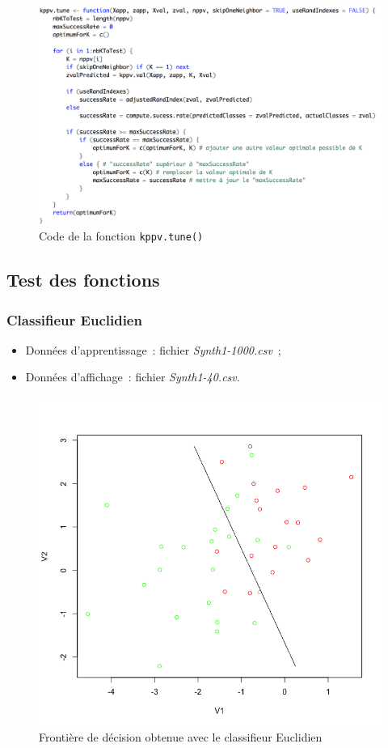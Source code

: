 \documentclass[a4paper,10pt]{report}
\begin{document}
\begin{figure}[H]
	\centering
	\captionsetup{justification=centering, margin=4cm}
	\includegraphics[width=.9\linewidth]{img/1-1-2-kppv-tune-code}
	\caption{\small Code de la fonction \texttt{kppv.tune()}}	
	\label{fig:1-1-2-kppv-tune-code}%
\end{figure}





\subsection{Test des fonctions}

\subsubsection{Classifieur Euclidien}


\begin{itemize}
	\item Données d'apprentissage~: fichier \textit{Synth1-1000.csv}~;
	\item Données d'affichage~: fichier \textit{Synth1-40.csv}.
\end{itemize}



\begin{figure}[H]
	\centering
	\captionsetup{justification=centering, margin=4cm}
	\includegraphics[width=.5\linewidth]{img/1-1-3-front-ceuc}
	\caption{\small Frontière de décision obtenue avec le classifieur Euclidien}	
	\label{fig:1-1-3-front-ceuc}%
\end{figure}
\end{document}
